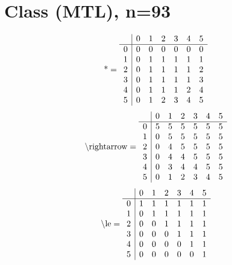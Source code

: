 \documentclass[11pt]{article}
\begin{document}
\section{Class (MTL), n=93}
\[\text{*} = 
\begin{array}{r | r r r r r r}
 & 0 & 1 & 2 & 3 & 4 & 5 \\ \hline
0 & 0 & 0 & 0 & 0 & 0 & 0 \\
1 & 0 & 1 & 1 & 1 & 1 & 1 \\
2 & 0 & 1 & 1 & 1 & 1 & 2 \\
3 & 0 & 1 & 1 & 1 & 1 & 3 \\
4 & 0 & 1 & 1 & 1 & 2 & 4 \\
5 & 0 & 1 & 2 & 3 & 4 & 5 \\
\end{array}
\]
\[\text{\textbackslash rightarrow} = 
\begin{array}{r | r r r r r r}
 & 0 & 1 & 2 & 3 & 4 & 5 \\ \hline
0 & 5 & 5 & 5 & 5 & 5 & 5 \\
1 & 0 & 5 & 5 & 5 & 5 & 5 \\
2 & 0 & 4 & 5 & 5 & 5 & 5 \\
3 & 0 & 4 & 4 & 5 & 5 & 5 \\
4 & 0 & 3 & 4 & 4 & 5 & 5 \\
5 & 0 & 1 & 2 & 3 & 4 & 5 \\
\end{array}
\]
\[\text{\textbackslash le} = 
\begin{array}{r | r r r r r r}
 & 0 & 1 & 2 & 3 & 4 & 5 \\ \hline
0 & 1 & 1 & 1 & 1 & 1 & 1 \\
1 & 0 & 1 & 1 & 1 & 1 & 1 \\
2 & 0 & 0 & 1 & 1 & 1 & 1 \\
3 & 0 & 0 & 0 & 1 & 1 & 1 \\
4 & 0 & 0 & 0 & 0 & 1 & 1 \\
5 & 0 & 0 & 0 & 0 & 0 & 1 \\
\end{array}
\]
\end{document}
